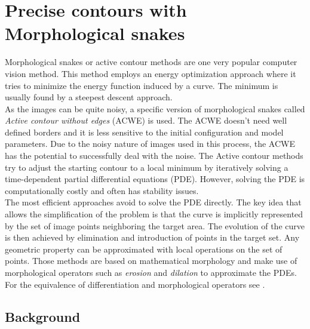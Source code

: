 
\section{Precise contours with Morphological snakes}

Morphological snakes or active contour methods are one very popular computer vision method. This method employs an energy optimization approach where it tries to minimize the energy function induced by a curve.  The minimum is usually found by a steepest descent approach. \\

As the images can be quite noisy, a specific version of morphological snakes called \textit{Active contour without edges} (ACWE) is used. The ACWE doesn't need well defined borders and it is less sensitive to the initial configuration and model parameters. Due to the noisy nature of images used in this process, the ACWE has the potential to successfully deal with the noise. The Active contour methods try to adjust the starting contour to a local minimum by iteratively solving a time-dependent partial differential equations (PDE). However, solving the PDE is computationally costly and often has stability issues. \\

The most efficient approaches avoid to solve the PDE directly. The key idea that allows the simplification of the problem is that the curve is implicitly  represented by the set of image points neighboring the target area. The evolution of the curve is then achieved by elimination and introduction of points in the target set. Any geometric property can be approximated with local operations on the set of points. Those methods are based on mathematical morphology and make use of morphological operators such as \textit{erosion} and \textit{dilation} to approximate the PDEs. For the equivalence of differentiation and morphological operators see \cite{Pami2013}.




\subsection{Background }


